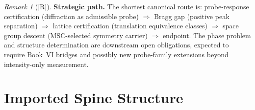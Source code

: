 \documentclass[12pt,oneside]{amsbook}
\theoremstyle{plain}
\theoremstyle{definition}
\theoremstyle{remark}
\newtheorem{remark}[theorem]{Remark}
\newcommand{\status}[1]{\textup{[#1]}}
\begin{document}
\begin{remark}[\status{R}]\label{rem:cryst-strategic-path}
\textbf{Strategic path.}
The shortest canonical route is: probe-response certification
(diffraction as admissible probe) $\Rightarrow$ Bragg gap
(positive peak separation) $\Rightarrow$ lattice certification
(translation equivalence classes) $\Rightarrow$ space group descent
(MSC-selected symmetry carrier) $\Rightarrow$ endpoint.  The phase
problem and structure determination are downstream open obligations,
expected to require Book~VI bridges and possibly new
probe-family extensions beyond intensity-only measurement.
\end{remark}

\section{Imported Spine Structure}
\label{sec:cryst-imports}
\end{document}
